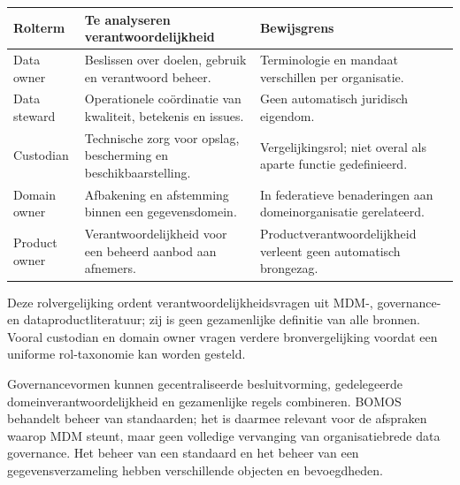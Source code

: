 \begin{longtable}{@{}P{.20\linewidth}P{.38\linewidth}P{.34\linewidth}@{}}
\toprule Rolterm & Te analyseren verantwoordelijkheid & Bewijsgrens \\\midrule
Data owner & Beslissen over doelen, gebruik en verantwoord beheer. & Terminologie en mandaat verschillen per organisatie. \\
Data steward & Operationele coördinatie van kwaliteit, betekenis en issues. & Geen automatisch juridisch eigendom. \\
Custodian & Technische zorg voor opslag, bescherming en beschikbaarstelling. & Vergelijkingsrol; niet overal als aparte functie gedefinieerd. \\
Domain owner & Afbakening en afstemming binnen een gegevensdomein. & In federatieve benaderingen aan domeinorganisatie gerelateerd. \\
Product owner & Verantwoordelijkheid voor een beheerd aanbod aan afnemers. & Productverantwoordelijkheid verleent geen automatisch brongezag. \\
\bottomrule
\end{longtable}
Deze rolvergelijking ordent verantwoordelijkheidsvragen uit MDM-, governance- en dataproductliteratuur; zij is geen gezamenlijke definitie van alle bronnen. Vooral custodian en domain owner vragen verdere bronvergelijking voordat een uniforme rol-taxonomie kan worden gesteld. \parencite{L20,L07,L23,S51}

Governancevormen kunnen gecentraliseerde besluitvorming, gedelegeerde domeinverantwoordelijkheid en gezamenlijke regels combineren. BOMOS behandelt beheer van standaarden; het is daarmee relevant voor de afspraken waarop MDM steunt, maar geen volledige vervanging van organisatiebrede data governance. Het beheer van een standaard en het beheer van een gegevensverzameling hebben verschillende objecten en bevoegdheden. \parencite{S23,L07}
